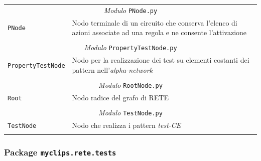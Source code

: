 \begin{longtable}{p{5.5cm}p{6.5cm}}
\multicolumn{2}{c}{\emph{Modulo} \texttt{PNode.py}}\\
	\hdashline[5pt/5pt]
		\texttt{PNode} & Nodo terminale di un circuito che conserva l'elenco di azioni associate ad una regola e ne consente l'attivazione \\ 
	\hline\\

\multicolumn{2}{c}{\emph{Modulo} \texttt{PropertyTestNode.py}}\\
	\hdashline[5pt/5pt]
		\texttt{PropertyTestNode} & Nodo per la realizzazione dei test su elementi costanti dei pattern nell'\emph{alpha-network}\\ 
	\hline\\

\multicolumn{2}{c}{\emph{Modulo} \texttt{RootNode.py}}\\
	\hdashline[5pt/5pt]
		\texttt{Root} & Nodo radice del grafo di RETE\\ 
	\hline\\

\multicolumn{2}{c}{\emph{Modulo} \texttt{TestNode.py}}\\
	\hdashline[5pt/5pt]
		\texttt{TestNode} & Nodo che realizza i pattern \emph{test-CE}\\ 
	\hline\\

\end{longtable}


\subsubsection{Package \texttt{myclips.rete.tests}}

